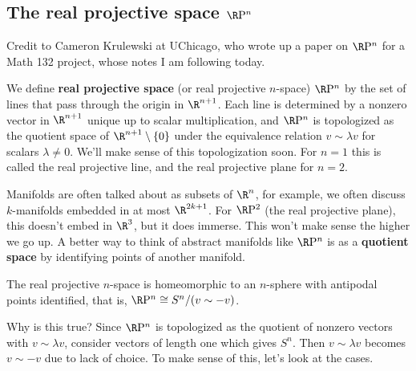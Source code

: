 \subsection{The real projective space $\R \mathrm P^n$}
Credit to Cameron Krulewski at UChicago, who wrote up a paper on $\R \mathrm P^n$ for a Math 132 project, whose notes I am following today.
\orbreak
\begin{definition}
    We define \textbf{real projective space} (or real projective $n$-space) $\R\mathrm P^n$ by the set of lines that pass through the origin in $\R^{n+1}$. Each line is determined by a nonzero vector in $\R^{n+1}$ unique up to scalar multiplication, and $\R\mathrm P^n $ is topologized as the quotient space of $\R^{n+1}\setminus \{0\} $ under the equivalence relation $v\sim \lambda v$ for scalars $\lambda\neq 0$. We'll make sense of this topologization soon. For $n=1$ this is called the real projective line, and the real projective plane for $n=2$.
\end{definition}
Manifolds are often talked about as subsets of $\R^n$, for example, we often discuss $k$-manifolds embedded in at most $\R^{2k+1}$. For $\R \mathrm P^2$ (the real projective plane), this doesn't embed in $\R^3$, but it does immerse. This won't make sense the higher we go up. A better way to think of abstract manifolds like $\R \mathrm P^n$ is as a \textbf{quotient space} by identifying points of another manifold.
\begin{claim}
    The real projective $n$-space is homeomorphic to an $n$-sphere with antipodal points identified, that is, $\R \mathrm P^n \cong S^n/ (v \sim -v)$.
\end{claim}
Why is this true? Since $\R\mathrm P^n $ is topologized as the quotient of nonzero vectors with $v\sim \lambda v$, consider vectors of length one which gives $S^n .$ Then $v\sim \lambda v$ becomes $v\sim -v$ due to lack of choice. To make sense of this, let's look at the cases. 
